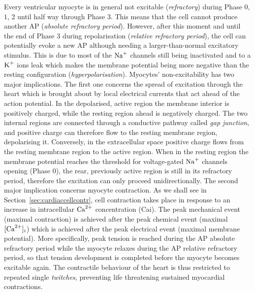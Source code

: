 \vspace{0.2cm}
Every ventricular myocyte is in general not excitable (\textit{refractory}) during Phase $0$, $1$, $2$ until half way through Phase $3$. This means that the cell cannot produce another AP (\textit{absolute refractory period}). However, after this moment and until the end of Phase $3$ during repolarisation (\textit{relative refractory period}), the cell can potentially evoke a new AP although needing a larger-than-normal excitatory stimulus. This is due to most of the $\textrm{Na}^{+}$ channels still being inactivated and to a $\textrm{K}^{+}$ ions leak which makes the membrane potential being more negative than the resting configuration (\textit{hyperpolarisation}). Myocytes' non-excitability has two major implications. The first one concerns the spread of excitation through the heart which is brought about by local electrical currents that act ahead of the action potential. In the depolarised, active region the membrane interior is positively charged, while the resting region ahead is negatively charged. The two internal regions are connected through a conductive pathway called \textit{gap junction}, and positive charge can therefore flow to the resting membrane region, depolarising it. Conversely, in the extracellular space positive charge flows from the resting membrane region to the active region. When in the resting region the membrane potential reaches the threshold for voltage-gated $\textrm{Na}^{+}$ channels opening (Phase $0$), the rear, previously active region is still in its refractory period, therefore the excitation can only proceed unidirectionally. The second major implication concerns myocyte contraction. As we shall see in Section~\ref{sec:cardiaccellcontr}, cell contraction takes place in response to an increase in intracellular $\textrm{Ca}^{2+}$ concentration (\acs{Cai}). The peak mechanical event (maximal contraction) is achieved after the peak chemical event (maximal $[\textrm{Ca}^{2+}]_{i}$) which is achieved after the peak electrical event (maximal membrane potential). More specifically, peak tension is reached during the AP absolute refractory period while the myocyte relaxes during the AP relative refractory period, so that tension development is completed before the myocyte becomes excitable again. The contractile behaviour of the heart is thus restricted to repeated single \textit{twitches}, preventing life threatening sustained myocardial contractions.

